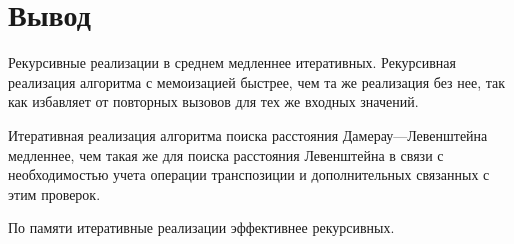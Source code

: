 \section{Вывод}
Рекурсивные реализации в среднем медленнее итеративных. Рекурсивная реализация алгоритма с мемоизацией быстрее, чем та же реализация без нее, так как избавляет от повторных вызовов для тех же входных значений.

Итеративная реализация алгоритма поиска расстояния Дамерау---Левенштейна медленнее, чем такая же для поиска расстояния Левенштейна в связи с необходимостью учета операции транспозиции и дополнительных связанных с этим проверок.

По памяти итеративные реализации эффективнее рекурсивных.


\clearpage